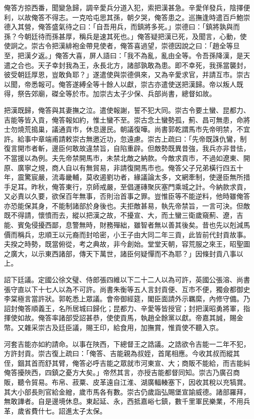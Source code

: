\begin{pinyinscope}
俺答方掠西番，聞變急歸，調辛愛兵分道入犯，索把漢甚急。辛愛佯發兵，陰擇便利，以故俺答不得志。一克哈屯思其孫，朝夕哭，俺答患之。巡撫逢時遣百戶鮑崇德入其營，俺答盛氣待之曰：「自吾用兵，而鎮將多死。」崇德曰：「鎮將孰與而孫？今朝廷待而孫甚厚，稱兵是速其死也。」俺答疑把漢已死，及聞言，心動，使使詗之。崇古令把漢緋袍金帶見使者，俺答喜過望，崇德因說之曰：「趙全等旦至，把漢夕返。」俺答大喜，屏人語曰：「我不為亂，亂由全等。令吾孫降漢，是天遣之合也。天子幸封我為王，永長北方，諸部孰敢為患。即不幸死，我孫當襲封，彼受朝廷厚恩，豈敢負耶？」遂遣使與崇德俱來，又為辛愛求官，并請互市。崇古以聞，帝悉報可。俺答遂縛全等十餘人以獻，崇古亦遣使送把漢歸。帝以叛人既得，祭告郊廟，磔全等於市。加崇古太子少保、兵部尚書，總督如故。

把漢既歸，俺答與其妻撫之泣。遣使報謝，誓不犯大同。崇古令要土蠻、昆都力、吉能等皆入貢，俺答報如約，惟土蠻不至。崇古念土蠻勢孤，薊、昌可無患，命將士勿燒荒搗巢，議通貢市，休息邊民。朝議復嘩。尚書郭乾謂馬市先帝明禁，不宜許。給事中章端甫請敕崇古無邀近功，忽遠慮。崇古上疏曰：「先帝既誅仇鸞，制復言開市者斬，邊臣何敢故違禁旨，自陷重辟。但敵勢既異昔強，我兵亦非昔怯，不當援以為例。夫先帝禁開馬市，未禁北敵之納款。今敵求貢市，不過如遼東、開原、廣寧之規，商人自以有無貿易，非請復開馬市也。俺答父子兄弟橫行四五十年，震驚宸嚴，流毒畿輔，莫收遏劉功者，緣議論太多，文網牽制，使邊臣無所措手足耳。昨秋，俺答東行，京師戒嚴，至倡運磚聚灰塞門乘城之計。今納款求貢，又必責以久要，欲保百年無事，否則治首事之罪。豈惟臣等不能逆料，他時雖俺答亦恐能保其身，不能制諸部於身後也。夫拒敵甚易，執先帝禁旨，一言可決。但敵既不得請，懷憤而去，縱以把漢之故，不擾宣、大，而土蠻三衛歲窺薊、遼，吉能、賓兔侵擾西鄙，息警無時，財務殫絀，雖智者無以善其後矣。昔也先以剋減馬價而稱兵，忠順王以元裔而封哈密，小王子由大同二年三貢，此皆前代封貢故事。夫揆之時勢，既當俯從，考之典故，非今創始。堂堂天朝，容荒服之來王，昭聖圖之廣大，以示東西諸部，傳天下萬世，諸臣何疑憚而不為耶？」因條封貢八事以上。

詔下廷議。定國公徐文璧、侍郎張四維以下二十二人以為可許，英國公張溶、尚書張守直以下十七人以為不可許。尚書朱衡等五人言封貢便、互市不便，獨僉都御史李棠極言當許狀。郭乾悉上眾議。會帝御經筵，閣臣面請外示羈縻，內修守備。乃詔封俺答順義王，名所居城曰歸化；昆都力、辛愛等皆授官；封把漢昭勇將軍，指揮使如故。俺答率諸部受詔甚恭，使使貢馬，執趙全餘黨以獻。帝嘉其誠，賜金幣。又雜采崇古及廷臣議，賜王印，給食用，加撫賞，惟貢使不聽入京。

河套吉能亦如約請命。以事在陜西，下總督王之誥議。之誥欲令吉能一二年不犯，方許封貢。崇古復上疏曰：「俺答、吉能親為叔姪，首尾相應。今收其叔而縱其侄，錮其首而舒其臂，俺答必呼吉能之眾就市河東宣、大；商販不能給，而吉能糾俺答擾陜西，四鎮之憂方大矣。」帝然其言，亦授吉能都督同知。崇古乃廣召商販，聽令貿易。布帛、菽粟、皮革遠自江淮、湖廣輻輳塞下，因收其稅以充犒賞。其大小部長則官給金繒，歲市馬各有數。崇古仍歲詣弘賜堡宣諭威德。諸部羅拜，無敢譁者。自是邊境休息。東起延、永，西抵嘉峪七鎮，數千里軍民樂業，不用兵革，歲省費什七。詔進太子太保。


\end{pinyinscope}
